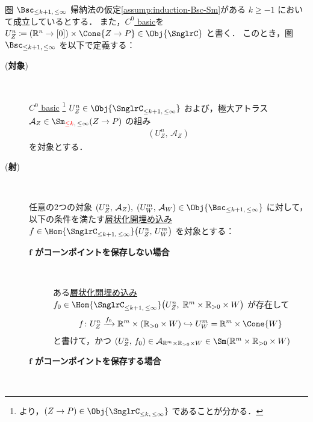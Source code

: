 \documentclass[TQFT_main]{subfiles}
\begin{document}
\begin{mydef}[label=def:Bsc-induction,breakable]{圏 $\Bsc_{\le k+1,\, \le \infty}$}
    帰納法の仮定\ref{assump:induction-Bsc-Sm}がある $k \ge -1$ において成立しているとする．
    また，\hyperref[def:C0-basic]{$C^0$ basic}を $U^n_Z \coloneqq (\mathbb{R}^n \to [0]) \times \Cone{Z \to P} \in \Obj{\SnglrC}$ と書く．
    このとき，圏 $\Bsc_{\le k+1,\, \le \infty}$ を以下で定義する：
    \begin{description}
        \item[(\textbf{対象})]　
        
        \hyperref[def:C0-basic]{$C^0$ basic}
        \footnote{より，$(Z \to P) \in \Obj{\SnglrC_{\le k,\, \le \infty}}$ であることが分かる．} $U^n_Z \in \Obj{\SnglrC_{\le k+1,\, \le \infty}}$ および，極大アトラス $\mathcal{A}_Z \in \Sm_{\textcolor{red}{\le k},\, \le \infty} (Z \to P)$ の組み
        \begin{align}
            (U^n_Z,\, \mathcal{A}_Z)
        \end{align}
        を対象とする．

        \item[(\textbf{射})]　
        
        任意の2つの対象 $(U^n_Z,\, \mathcal{A}_Z),\; (U^m_W,\, \mathcal{A}_W) \in \Obj{\Bsc_{\le k+1,\, \le \infty}}$ に対して，以下の条件を満たす\hyperref[def:strat-emb]{層状化開埋め込み} $f \in \Hom{\SnglrC_{\le k+1,\, \le \infty}} \bigl(U^n_Z,\, U^m_W \bigr)$ を対象とする：
        \begin{description}
            \item[\textbf{$\bm{f}$ がコーンポイントを保存しない場合}]　  
            
            ある\hyperref[def:strat-emb]{層状化開埋め込み} $f_0 \in \Hom{\SnglrC_{\le k+1,\, \le \infty}} \bigl(U^n_Z,\; \mathbb{R}^m \times \mathbb{R}_{> 0} \times W\bigr)$ が存在して
            \begin{align}
                f \colon U^n_Z \xrightarrow{f_0} \mathbb{R}^m \times (\mathbb{R}_{> 0} \times W) \hookrightarrow U^m_W = \mathbb{R}^m \times \Cone{W}
            \end{align}
            と書けて，かつ $(U^n_Z,\, f_0) \in \mathcal{A}_{\mathbb{R}^m \times \mathbb{R}_{> 0} \times W} \in \Sm(\mathbb{R}^m \times \mathbb{R}_{> 0} \times W)$
            
            \item[\textbf{$\bm{f}$ がコーンポイントを保存する場合}]　 
            

\end{description}
\end{description}
\end{mydef}
\end{document}
